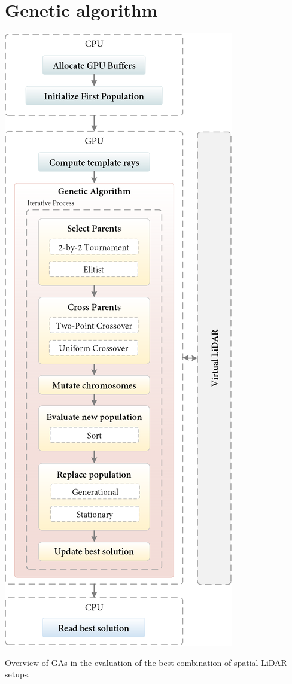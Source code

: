 \section{Genetic algorithm}

\begin{marginfigure}[-6.0cm]
    \centering
    \includegraphics[width=\linewidth]{figs/lidar_optimization/genetic_overview.png}
	\caption{Overview of GAs in the evaluation of the best combination of spatial LiDAR setups.}
	\label{fig:genetic_overview}
\end{marginfigure}
